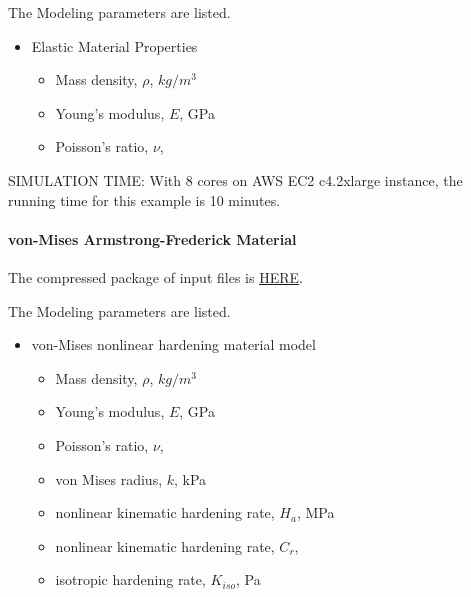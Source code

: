 The Modeling parameters are listed.
\begin{itemize}
  \item Elastic Material Properties 
  \begin{itemize}
    \item Mass density, $\rho$, \enspace {} $kg/m^3$
    \item Young's modulus, $E$, \enspace {} GPa
    \item Poisson's ratio, $\nu$, \enspace {}
  \end{itemize}
\end{itemize}


SIMULATION TIME: With 8 cores on AWS EC2 c4.2xlarge instance, the running time for this example is 10 minutes.

\paragraph{von-Mises Armstrong-Frederick Material}
The compressed package of input files is  
\href{https://github.com/yuan-energy/Real-ESSI-Short-Course-Examples/tree/master/short-course-examples/nonlinear_analysis_steps/soil-structure/vonMisesArmstrongFrederick/vonMisesArmstrongFrederick.tgz?raw=true}{HERE}. 


The Modeling parameters are listed.
\begin{itemize}
  \item von-Mises nonlinear hardening material model 
  \begin{itemize}
    \item Mass density, $\rho$, \enspace {} $kg/m^3$
    \item Young's modulus, $E$, \enspace {} GPa
    \item Poisson's ratio, $\nu$, \enspace {}
    \item von Mises radius, $k$, \enspace {} kPa
    \item nonlinear kinematic hardening rate, $H_a$, \enspace {} MPa
    \item nonlinear kinematic hardening rate, $C_r$, \enspace {}
    \item isotropic hardening rate, $K_{iso}$, \enspace {} Pa
  \end{itemize}
\end{itemize}


